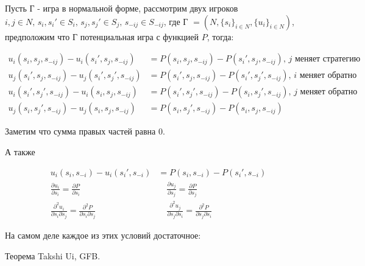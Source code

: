 Пусть Г - игра в нормальной форме, рассмотрим двух игроков $i, j \in N, \, s_i, s_i' \in S_i, \, s_j, s_j' \in S_j, \, s_{-ij} \in S_{-ij}$, где Г  $= (N, \{s_i\}_{i \in N}, \{u_i\}_{i \in N})$, предположим что Г потенциальная игра с функцией  $P$, тогда:

\begin{align*}
	u_i(s_i, s_j, s_{-ij}) - u_i(s_i', s_j, s_{-ij}) &= P(s_i, s_j, s_{-ij}) - P(s_i', s_j, s_{-ij}) \text{, $j$ меняет стратегию} \\
	u_j(s_i', s_j, s_{-ij}) - u_j(s_i', s_j', s_{-ij}) &= P(s_i', s_j, s_{-ij}) - P(s_i', s_j', s_{-ij}) \text{, $i$ меняет обратно}\\
	u_i(s_i', s_j', s_{-ij}) - u_i(s_i, s_j, s_{-ij}) &= P(s_i', s_j', s_{-ij}) - P(s_i, s_j', s_{-ij}) \text{, $j$ меняет обратно} \\
	u_j(s_i, s_j', s_{-ij}) - u_j(s_i, s_j, s_{-ij}) &= P(s_i, s_j', s_{-ij}) - P(s_i, s_j, s_{-ij})
\end{align*}

Заметим что сумма правых частей равна 0.

А также

\begin{align*}
	u_i(s_i, s_{-i}) - u_i(s_i', s_{-i}) &= P(s_i, s_{-i}) - P(s_i', s_{-i}) \\
	\frac{\partial u_i}{\partial s_i} = \frac{\partial P}{\partial s_i} \quad&\quad \frac{\partial u_j}{\partial s_j} = \frac{\partial P}{\partial s_j} \\
	\frac{\partial^2 u_i}{\partial s_i \partial s_j} = \frac{\partial^2 P}{\partial s_i \partial s_j} \quad&\quad \frac{\partial^2 u_j}{\partial s_j \partial s_i} = \frac{\partial^2 P}{\partial s_j \partial s_i}
\end{align*}


На самом деле каждое из этих условий достаточное:

Теорема Takshi Ui, GFB.

